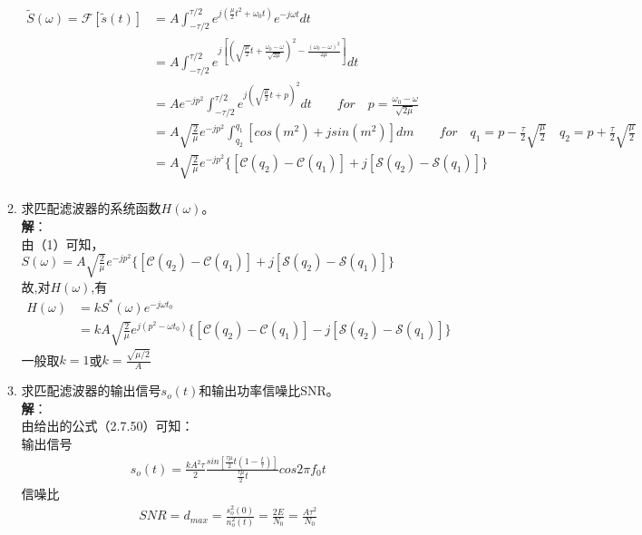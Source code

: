 \documentclass{article}
\begin{document}
\begin{enumerate}[1.]
\begin{enumerate}[(1)]
\begin{equation*}%
\begin{split}
 \widetilde{S}(\omega)=\mathscr{F}[ \widetilde{s}(t) ]
	&=A\int_{-\tau/2}^{\tau/2}e^{j(\frac{\mu}{2}t^{2}+\omega_{0}t)}e^{-j\omega t}dt\\
	&=A\int_{-\tau/2}^{\tau/2}e^{j[(\sqrt{\frac{\mu}{2}}t+\frac{\omega_{0}-\omega}{\sqrt{2\mu}})^{2}-\frac{(\omega_{0}-\omega)^2}{2\mu}]}dt\\
	&=Ae^{-jp^{2}}\int_{-\tau/2}^{\tau/2}e^{j(\sqrt{\frac{\mu}{2}}t+p)^{2}}dt
	\qquad for\quad p=\frac{\omega_{0}-\omega}{\sqrt{2\mu}}\\
	&=A\sqrt{\frac{2}{\mu}}e^{-jp^{2}}\int_{q_{2}}^{q_{1}}[cos(m^{2})+jsin(m^{2})]dm
	\qquad for \quad q_{1}=p-\frac{\tau}{2}\sqrt{\frac{\mu}{2}} \quad q_{2}=p+\frac{\tau}{2}\sqrt{\frac{\mu}{2}} \\
	&=A\sqrt{\frac{2}{\mu}}e^{-jp^{2}}\{[\mathcal{C}(q_{2})-\mathcal{C}(q_{1})]+j[\mathcal{S}(q_{2})-\mathcal{S}(q_{1})]\}\\
\end{split}
\end{equation*}
\item 求匹配滤波器的系统函数$H(\omega)$。\\
\textbf{解}：\\
由（1）可知，$S(\omega)=A\sqrt{\frac{2}{\mu}}e^{-jp^{2}}\{[\mathcal{C}(q_{2})-\mathcal{C}(q_{1})]+j[\mathcal{S}(q_{2})-\mathcal{S}(q_{1})]\}$\\
故,对$H(\omega)$,有
\begin{equation*}
\begin{split}
H(\omega)
&= kS^{*}(\omega)e^{-j\omega t_{0}}\\
&=kA\sqrt{\frac{2}{\mu}}e^{j(p^{2}-\omega t_{0})}\{[\mathcal{C}(q_{2})-\mathcal{C}(q_{1})] - j[\mathcal{S}(q_{2})-\mathcal{S}(q_{1})]\}
\end{split}
\end{equation*}
一般取$k=1$或$k=\frac{\sqrt{\mu/2}} {A}$
\item 求匹配滤波器的输出信号$s_{o}(t)$和输出功率信噪比SNR。\\
\textbf{解}：\\
由给出的公式（2.7.50）可知：\\输出信号
\begin{equation*}
\begin{split}
s_{o}(t)=\frac{kA^{2}\tau}{2} \frac{sin[ \frac{\tau\mu}{2}t(1-\frac{t}{\tau}) ]} { \frac{\tau\mu}{2}t }  cos2\pi f_{0}t
\end{split}
\end{equation*}
信噪比\\
\begin{equation*}
\begin{split}
SNR=d_{max} = \frac{s_{o}^{2}(0)} {n_{o}^{2}(t)} = \frac{2E} {N_{0}}=\frac{A\tau^{2}} {N_{0}}
\end{split}
\end{equation*}


\end{enumerate}
\end{enumerate}
\end{document}
